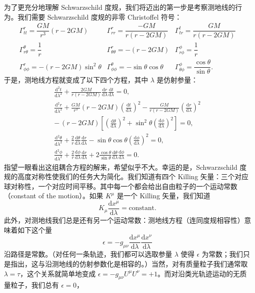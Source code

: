 为了更充分地理解 Schwarzschild 度规，我们将迈出的第一步是考察测地线的行为。我们需要 Schwarzschild 度规的非零 Christoffel 符号：
\begin{equation*}
\begin{array}{lll}
\Gamma^r_{tt} = \dfrac{GM}{r^3}(r-2GM) & \Gamma^r_{rr} = \dfrac{-GM}{r(r-2GM)} & \Gamma^t_{tr} = \dfrac{GM}{r(r-2GM)}\\[10pt]
\Gamma^\theta_{r\theta} = \dfrac{1}{r} & \Gamma^r_{\theta\theta} = -(r-2GM) & \Gamma^\phi_{r\phi} = \dfrac{1}{r}\\[10pt]
\Gamma^r_{\phi\phi} = -(r-2GM)\sin^2\theta & \Gamma^\theta_{\phi\phi} = -\sin\theta\cos\theta & \Gamma^\phi_{\theta\phi} = \dfrac{\cos\theta}{\sin\theta}.
\end{array}
\tag{5.52}
\end{equation*}
于是，测地线方程就变成了以下四个方程，其中 $\lambda$ 是仿射参量：
\begin{gather*}
\frac{\mathrm{d}^2 t}{\mathrm{d}\lambda^2} + \frac{2GM}{r(r-2GM)}\frac{\mathrm{d}r}{\mathrm{d}\lambda}\frac{\mathrm{d}t}{\mathrm{d}\lambda} = 0,\\[8pt]
\frac{\mathrm{d}^2 r}{\mathrm{d}\lambda^2} + \frac{GM}{r^3}(r-2GM)\left(\frac{\mathrm{d}t}{\mathrm{d}\lambda}\right)^2 - \frac{GM}{r(r-2GM)}\left(\frac{\mathrm{d}r}{\mathrm{d}\lambda}\right)^2\\[2pt]
-\,(r-2GM)\left[\left(\frac{\mathrm{d}\theta}{\mathrm{d}\lambda}\right)^2 + \sin^2\theta\left(\frac{\mathrm{d}\phi}{\mathrm{d}\lambda}\right)^2\right] = 0,\\[8pt]
\frac{\mathrm{d}^2\theta}{\mathrm{d}\lambda^2} + \frac{2}{r}\frac{\mathrm{d}\theta}{\mathrm{d}\lambda}\frac{\mathrm{d}r}{\mathrm{d}\lambda} - \sin\theta\cos\theta\left(\frac{\mathrm{d}\phi}{\mathrm{d}\lambda}\right)^2 = 0,\\[8pt]
\frac{\mathrm{d}^2\phi}{\mathrm{d}\lambda^2} + \frac{2}{r}\frac{\mathrm{d}\phi}{\mathrm{d}\lambda}\frac{\mathrm{d}r}{\mathrm{d}\lambda} + 2\frac{\cos\theta}{\sin\theta}\frac{\mathrm{d}\theta}{\mathrm{d}\lambda}\frac{\mathrm{d}\phi}{\mathrm{d}\lambda} = 0.
\tag{5.53}
\end{gather*}
指望一眼看出这组耦合方程的解来，希望似乎不大。幸运的是，Schwarzschild 度规的高度对称性使我们的任务大为简化。我们知道有四个 Killing 矢量：三个对应球对称性，一个对应时间平移。其中每一个都会给出自由粒子的一个运动常数（constant of the motion）。如果 $K^\mu$ 是一个 Killing 矢量，我们知道
\begin{equation*}
K_\mu\frac{\mathrm{d}x^\mu}{\mathrm{d}\lambda} = \mathrm{constant}.
\tag{5.54}
\end{equation*}
此外，对测地线我们总是还有另一个运动常数：测地线方程（连同度规相容性）意味着如下这个量
\begin{equation*}
\epsilon = -g_{\mu\nu}\frac{\mathrm{d}x^\mu}{\mathrm{d}\lambda}\frac{\mathrm{d}x^\nu}{\mathrm{d}\lambda}
\tag{5.55}
\end{equation*}
沿路径是常数。（对任何一条轨迹，我们都可以选取参量 $\lambda$ 使得 $\epsilon$ 为常数；我们只是指出，这与沿测地线的仿射参数化是相容的。）当然，对有质量粒子我们通常取 $\lambda = \tau$，这个关系就简单地变成 $\epsilon = -g_{\mu\nu}U^\mu U^\nu = +1$。而对沿类光轨迹运动的无质量粒子，我们总有 $\epsilon = 0$，

